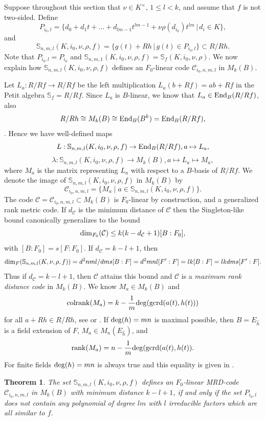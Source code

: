 \documentclass[12pt]{amsart}
\theoremstyle{plain}
\newtheorem{theorem}{Theorem}[section]
\theoremstyle{definition}
\numberwithin{equation}{section}
\numberwithin{figure}{section}
\begin{document}
Suppose throughout this section that $\nu\in K^\times$, $1\leq l<k$,
 and  assume that $f$ is not two-sided. Define
 $$P_{i_0,l}=\lbrace d_0+d_1t+\dots+d_{lm-1}t^{lm-1}+\nu\rho(d_{i_0})t^{lm}\,|\, d_i\in K \rbrace,$$
 and
$$\mathbb{S}_{n,m,l}(K,i_0,\nu,\rho, f)=\lbrace g(t)+Rh\,|\, g(t)\in P_{i_0,l}\rbrace\subset R/Rh.$$
Note that $P_{i_0,l}=P_{i_0}$ and  $\mathbb{S}_{n,m,1}(K,i_0,\nu,\rho, f)= \mathbb{S}_f(K,i_0,\nu,\rho)$.
We now explain how  $\mathbb{S}_{n,m,l}(K,i_0,\nu,\rho, f)$ defines an $F_0$-linear code  $\mathcal{C}_{i_0, n,m,l}$ in $M_k(B)$.


   Let $L_a:R/Rf\to R/Rf$ be the left multiplication $L_a(b+Rf)=ab+Rf$ in the Petit algebra $\mathbb{S}_f=R/Rf$. Since
$L_a$ is $B$-linear, we know that $L_a\in {\rm End}_{B}(R/Rf)$, also
 $$ R/Rh \cong M_k(B)\cong {\rm End}_{B}(B^k)={\rm End}_{B}(R/Rf),$$
  \cite{PT}.  Hence we have well-defined maps
$$L: \mathbb{S}_{n,m,l}(K,i_0,\nu,\rho, f) \to {\rm End}_B(R/Rf), a\mapsto L_a,$$
$$\lambda: \mathbb{S}_{n,m,l}(K,i_0,\nu,\rho, f) \to M_k(B), a\mapsto L_a \mapsto M_a,$$
 where $M_a$ is the matrix representing $L_a$
with respect to a $B$-basis of $R/Rf$. We denote  the image of $\mathbb{S}_{n,m,l}(K,i_0,\nu,\rho,f)$ in $M_{k}(B)$ by
$$\mathcal{C}_{i_0,n,m,l}=\lbrace M_a\mid a\in \mathbb{S}_{n,m,l}(K,i_0,\nu,\rho,f)\rbrace.$$
The code $\mathcal{C}=\mathcal{C}_{i_0, n,m,l}\subset M_{k}(B)$  is $F_0$-linear by construction, and a generalized rank metric code.
If  $d_{\mathcal{C}}$ is the minimum distance of $\mathcal{C}$ then the Singleton-like bound canonically generalizes to the bound
$${\rm dim}_{F_0}(\mathcal{C})\leq k(k-d_{\mathcal{C}}+1)[B:F_0],$$
 with $[B:F_0]=s[F:F_0]$.
If $d_{\mathcal{C}}=k-l+1$, then
$${\rm dim}_{F}(\mathbb{S}_{n,m,l}(K,\nu,\rho, f))=d^2nml/dms [B:F]=d^2mnl [F':F] =lk [B:F]=lkdms[F' :F].$$
 Thus if $d_{\mathcal{C}}=k-l+1$, then $\mathcal{C}$ attains this bound and $\mathcal{C}$ is
a  \textit{maximum rank distance code} in $M_k(B)$.
 We know $M_a\in M_{k}(B)$ and
$$ {\rm colrank}(M_a)=k-\frac{1}{m}{\rm deg}({\rm gcrd}(a(t),h(t)))$$
 for all $a+Rh\in R/Rh$, see \cite[Theorem 3.13]{NewS} or \cite[Theorem 7]{PT2}.
 If ${\rm deg}(h)=mn$ is maximal possible, then $B=E_{\hat{h}}$ is a field extension of $F$, $M_a\in M_n(E_{\hat{h}})$, and
$${\rm rank}(M_a)= n - \frac{1}{m}{\rm deg}({\rm gcrd}(a(t),h(t)).$$
 For finite fields ${\rm deg}(h)=mn$ is always true and this equality  is given in \cite[Proposition 7]{Sheekey}.

\begin{theorem} \label{thm:MRD}
 The set
$\mathbb{S}_{n,m,l}(K,i_0,\nu,\rho, f)$  defines an $F_0$-linear MRD-code $\mathcal{C}_{i_0, n,m,l}$  in $M_{k}(B)$
 with minimum distance $k-l+1$, if and only if the set $P_{i_0,l}$ does not contain any polynomial of degree $lm$ with $l$ irreducible factors which are all similar to $f$.
\end{theorem}
\end{document}
